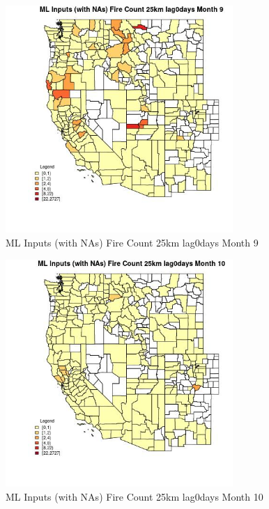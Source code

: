 \begin{figure} 
\centering  
\includegraphics[width=0.77\textwidth]{Code_Outputs/Report_ML_input_PM25_Step4_part_f_de_duplicated_aves_prioritize_24hr_obswNAs_CountyFire_Count_25km_lag0daysmedianMonth9.jpg} 
\caption{\label{fig:Report_ML_input_PM25_Step4_part_f_de_duplicated_aves_prioritize_24hr_obswNAsCountyFire_Count_25km_lag0daysmedianMonth9}ML Inputs (with NAs) Fire Count 25km lag0days Month 9} 
\end{figure} 
 

\begin{figure} 
\centering  
\includegraphics[width=0.77\textwidth]{Code_Outputs/Report_ML_input_PM25_Step4_part_f_de_duplicated_aves_prioritize_24hr_obswNAs_CountyFire_Count_25km_lag0daysmedianMonth10.jpg} 
\caption{\label{fig:Report_ML_input_PM25_Step4_part_f_de_duplicated_aves_prioritize_24hr_obswNAsCountyFire_Count_25km_lag0daysmedianMonth10}ML Inputs (with NAs) Fire Count 25km lag0days Month 10} 
\end{figure} 
 


